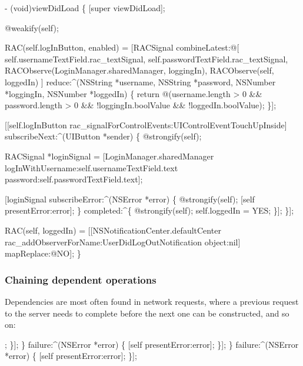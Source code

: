 \begin{DoxyCode}
- (void)viewDidLoad \{
    [super viewDidLoad];

    @weakify(self);

    RAC(self.logInButton, enabled) = [RACSignal
        combineLatest:@[
            self.usernameTextField.rac\_textSignal,
            self.passwordTextField.rac\_textSignal,
            RACObserve(LoginManager.sharedManager, loggingIn),
            RACObserve(self, loggedIn)
        ] reduce:^(NSString *username, NSString *password, NSNumber *loggingIn, NSNumber *loggedIn) \{
            return @(username.length > 0 && password.length > 0 && !loggingIn.boolValue &&
       !loggedIn.boolValue);
        \}];

    [[self.logInButton rac\_signalForControlEvents:UIControlEventTouchUpInside] subscribeNext:^(UIButton
       *sender) \{
        @strongify(self);

        RACSignal *loginSignal = [LoginManager.sharedManager
            logInWithUsername:self.usernameTextField.text
            password:self.passwordTextField.text];

            [loginSignal subscribeError:^(NSError *error) \{
                @strongify(self);
                [self presentError:error];
            \} completed:^\{
                @strongify(self);
                self.loggedIn = YES;
            \}];
    \}];

    RAC(self, loggedIn) = [[NSNotificationCenter.defaultCenter
        rac\_addObserverForName:UserDidLogOutNotification object:nil]
        mapReplace:@NO];
\}
\end{DoxyCode}


\subsubsection*{Chaining dependent operations}

Dependencies are most often found in network requests, where a previous request to the server needs to complete before the next one can be constructed, and so on\+:


\begin{DoxyCode}
[client logInWithSuccess:^\{
    [client loadCachedMessagesWithSuccess:^(NSArray *messages) \{
        [client fetchMessagesAfterMessage:messages.lastObject success:^(NSArray *nextMessages) \{
            NSLog(@"Fetched all messages.");
        \} failure:^(NSError *error) \{
            [self presentError:error];
        \}];
    \} failure:^(NSError *error) \{
        [self presentError:error];
    \}];
\} failure:^(NSError *error) \{
    [self presentError:error];
\}];
\end{DoxyCode}



